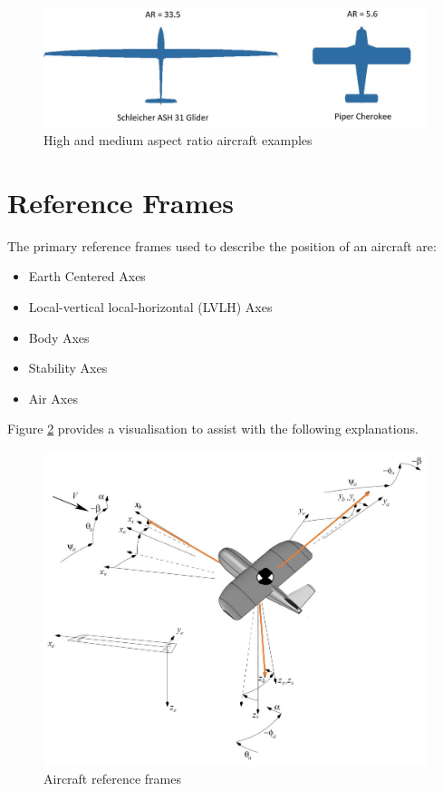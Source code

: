 \begin{figure}[H]
  \centering
  \includegraphics[width=1\linewidth]{03_LiteratureReview/Figs/AspectRatio.JPG}
  \caption{High and medium aspect ratio aircraft examples \cite{gliderImages}}
  \label{fig:AR}
\end{figure}

\section{Reference Frames}
The primary reference frames used to describe the position of an aircraft are:
\begin{itemize}
    \item Earth Centered Axes
    \item Local-vertical local-horizontal (LVLH) Axes
    \item Body Axes
    \item Stability Axes
    \item Air Axes
\end{itemize}

Figure \ref{fig:refernce} provides a visualisation to assist with the following explanations.

\begin{figure}[H]
  \centering
  \includegraphics[width=0.9\linewidth]{03_LiteratureReview/Figs/referenceFrame.JPG}
  \caption{Aircraft reference frames }
  \label{fig:refernce}
\end{figure}

